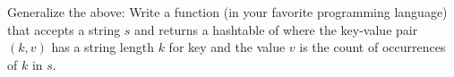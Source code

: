   Generalize the above:
  Write a function (in your favorite programming language)
  that accepts a string $s$ and
  returns a hashtable of where the key-value pair
  $(k, v)$ has a string length $k$ for key
  and the value $v$ is the count of
  occurrences of $k$ in $s$.
